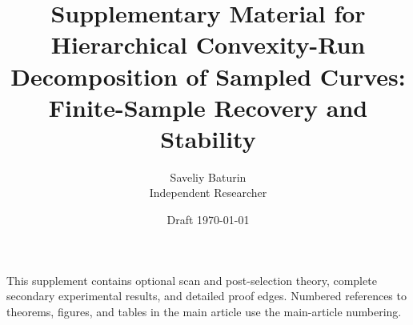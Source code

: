 \documentclass[11pt]{article}
\title{Supplementary Material for\\
Hierarchical Convexity-Run Decomposition of Sampled Curves:\\
Finite-Sample Recovery and Stability}
\author{Saveliy Baturin\\Independent Researcher}
\date{Draft \today}
\begin{document}
\maketitle

This supplement contains optional scan and post-selection theory, complete
secondary experimental results, and detailed proof edges.  Numbered references
to theorems, figures, and tables in the main article use the main-article
numbering.




\appendix


\footnotesize
\setlength{\bibsep}{1pt}


\end{document}
